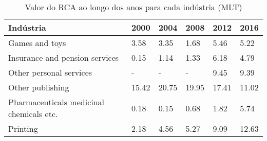 \begin{table}
\centering
\caption{Valor do RCA ao longo dos anos para cada indústria (MLT)}
\begin{tabular}{p{6cm}p{1.5cm}p{1.5cm}p{1.5cm}p{1.5cm}p{1.5cm}}
\toprule
                               Indústria &  2000 &  2004 &  2008 &  2012 &  2016 \\
\midrule
                          Games and toys &  3.58 &  3.35 &  1.68 &  5.46 &  5.22 \\
          Insurance and pension services &  0.15 &  1.14 &  1.33 &  6.18 &  4.79 \\
                 Other personal services &     - &     - &     - &  9.45 &  9.39 \\
                        Other publishing & 15.42 & 20.75 & 19.95 & 17.41 & 11.02 \\
Pharmaceuticals medicinal chemicals etc. &  0.18 &  0.15 &  0.68 &  1.82 &  5.74 \\
                                Printing &  2.18 &  4.56 &  5.27 &  9.09 & 12.63 \\
\bottomrule
\end{tabular}
\end{table}
